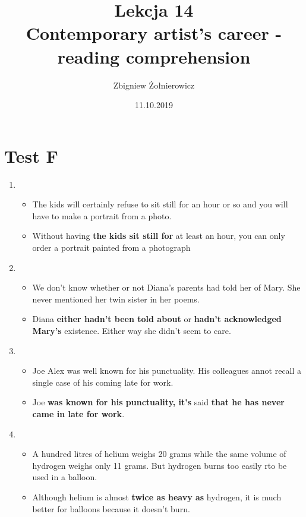 \documentclass[a4paper]{article}
\begin{document}
\title{{\huge Lekcja 14} \\
{\large Contemporary artist's career - reading comprehension}}
\author{Zbigniew Żołnierowicz}
\date{11.10.2019}
\maketitle
\section*{Test F}
\begin{enumerate}
    \item \begin{itemize}
        \item The kids will certainly refuse to sit still for an hour or so and you will have to make a portrait from a photo.
        \item Without having {\bf the kids sit still for} at least an hour, you can only order a portrait painted from a photograph
    \end{itemize}
    \item \begin{itemize}
        \item We don't know whether or not Diana's parents had told her of Mary. She never mentioned her twin sister in her poems.
        \item Diana {\bf either hadn't been told about} or {\bf hadn't acknowledged Mary's} existence. Either way she didn't seem to care.
    \end{itemize}
    \item \begin{itemize}
        \item Joe Alex was well known for his punctuality. His colleagues annot recall a single case of his coming late for work.
        \item Joe {\bf was known for his punctuality, it's} said {\bf that he has never came in late for work}.
    \end{itemize}
    \item \begin{itemize}
        \item A hundred litres of helium weighs 20 grams while the same volume of hydrogen weighs only 11 grams. But hydrogen burns too easily rto be used in a balloon.
        \item Although helium is almost {\bf twice as heavy as} hydrogen, it is much better for balloons because it doesn't burn.
    \end{itemize}

\end{enumerate}
\end{document}
